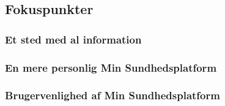 \subsection{Fokuspunkter}
\subsubsection{Et sted med al information}
\subsubsection{En mere personlig Min Sundhedsplatform}
\subsubsection{Brugervenlighed af Min Sundhedsplatform}
